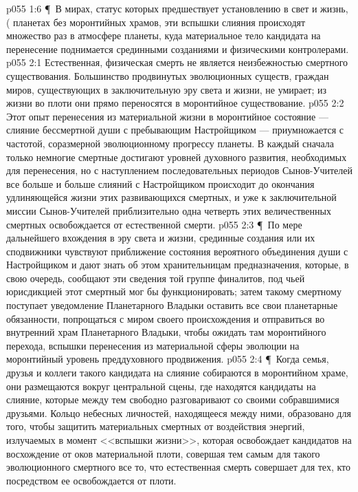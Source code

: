 \vs p055 1:6 \P\ В мирах, статус которых предшествует установлению в свет и жизнь, ( планетах без моронтийных храмов, эти вспышки слияния происходят множество раз в атмосфере планеты, куда материальное тело кандидата на перенесение поднимается срединными созданиями и физическими контролерами.
\vs p055 2:1 Естественная, физическая смерть не является неизбежностью смертного существования. Большинство продвинутых эволюционных существ, граждан миров, существующих в заключительную эру света и жизни, не умирает; из жизни во плоти они прямо переносятся в моронтийное существование.
\vs p055 2:2 Этот опыт перенесения из материальной жизни в моронтийное состояние --- слияние бессмертной души с пребывающим Настройщиком --- приумножается с частотой, соразмерной эволюционному прогрессу планеты. В каждый сначала только немногие смертные достигают уровней духовного развития, необходимых для перенесения, но с наступлением последовательных периодов Сынов\hyp{}Учителей все больше и больше слияний с Настройщиком происходит до окончания удлиняющейся жизни этих развивающихся смертных, и уже к заключительной миссии Сынов\hyp{}Учителей приблизительно одна четверть этих величественных смертных освобождается от естественной смерти.
\vs p055 2:3 \P\ По мере дальнейшего вхождения в эру света и жизни, срединные создания или их сподвижники чувствуют приближение состояния вероятного объединения души с Настройщиком и дают знать об этом хранительницам предназначения, которые, в свою очередь, сообщают эти сведения той группе финалитов, под чьей юрисдикцией этот смертный мог бы функционировать; затем такому смертному поступает уведомление Планетарного Владыки оставить все свои планетарные обязанности, попрощаться с миром своего происхождения и отправиться во внутренний храм Планетарного Владыки, чтобы ожидать там моронтийного перехода, вспышки перенесения из материальной сферы эволюции на моронтийный уровень преддуховного продвижения.
\vs p055 2:4 \P\ Когда семья, друзья и коллеги такого кандидата на слияние собираются в моронтийном храме, они размещаются вокруг центральной сцены, где находятся кандидаты на слияние, которые между тем свободно разговаривают со своими собравшимися друзьями. Кольцо небесных личностей, находящееся между ними, образовано для того, чтобы защитить материальных смертных от воздействия энергий, излучаемых в момент <<вспышки жизни>>, которая освобождает кандидатов на восхождение от оков материальной плоти, совершая тем самым для такого эволюционного смертного все то, что естественная смерть совершает для тех, кто посредством ее освобождается от плоти.
